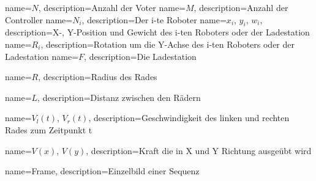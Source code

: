 {
       name={\ensuremath{N}},
       description={Anzahl der Voter}
}
{
       name={\ensuremath{M}},
       description={Anzahl der Controller}
}
{
       name={\ensuremath{N_i}},
       description={Der i-te Roboter}
}
{
       name={\ensuremath{x_i}, \ensuremath{y_i}, \ensuremath{w_i}},
       description={X-, Y-Position und Gewicht des i-ten Roboters oder der Ladestation}
}
{
       name={\ensuremath{R_i}},
       description={Rotation um die Y-Achse des i-ten Roboters oder der Ladestation}
}
{
       name={\ensuremath{F}},
       description={Die Ladestation}
}

{
       name={\ensuremath{R}},
       description={Radius des Rades}
}

{
       name={\ensuremath{L}},
       description={Distanz zwischen den R{\"{a}}dern}
}

{
       name={\ensuremath{V_l(t)}, \ensuremath{V_r(t)}},
       description={Geschwindigkeit des linken und rechten Rades zum Zeitpunkt t}
}

{
       name={\ensuremath{V(x)}, \ensuremath{V(y)}},
       description={Kraft die in X und Y Richtung ausge{\"{u}}bt wird}
}

{
       name={Frame},
       description={Einzelbild einer Sequenz}
}
